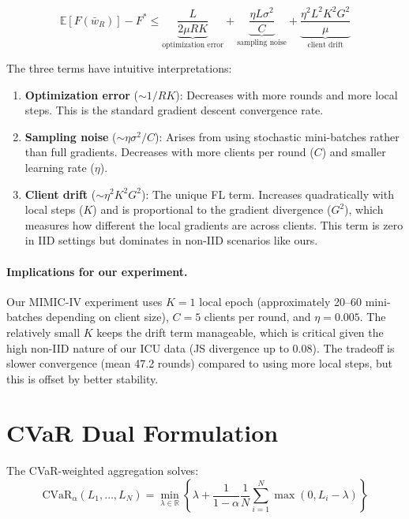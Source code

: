 \documentclass[11pt,a4paper]{report}
\begin{document}
\begin{equation}
\mathbb{E}[F(\bar{w}_R)] - F^* \leq \underbrace{\frac{L}{2\mu R K}}_{\text{optimization error}} + \underbrace{\frac{\eta L \sigma^2}{C}}_{\text{sampling noise}} + \underbrace{\frac{\eta^2 L^2 K^2 G^2}{\mu}}_{\text{client drift}}
\label{eq:fedavg_bound}
\end{equation}

The three terms have intuitive interpretations:
\begin{enumerate}[leftmargin=2em]
\item \textbf{Optimization error} ($\sim 1/RK$): Decreases with more rounds and more local steps. This is the standard gradient descent convergence rate.
\item \textbf{Sampling noise} ($\sim \eta\sigma^2/C$): Arises from using stochastic mini-batches rather than full gradients. Decreases with more clients per round ($C$) and smaller learning rate ($\eta$).
\item \textbf{Client drift} ($\sim \eta^2 K^2 G^2$): The unique FL term. Increases quadratically with local steps ($K$) and is proportional to the gradient divergence ($G^2$), which measures how different the local gradients are across clients. This term is zero in IID settings but dominates in non-IID scenarios like ours.
\end{enumerate}

\paragraph{Implications for our experiment.} Our MIMIC-IV experiment uses $K=1$ local epoch (approximately 20--60 mini-batches depending on client size), $C=5$ clients per round, and $\eta=0.005$. The relatively small $K$ keeps the drift term manageable, which is critical given the high non-IID nature of our ICU data (JS divergence up to 0.08). The tradeoff is slower convergence (mean 47.2 rounds) compared to using more local steps, but this is offset by better stability.

\section{CVaR Dual Formulation}

The CVaR-weighted aggregation solves:
\begin{equation}
\text{CVaR}_\alpha(L_1, \ldots, L_N) = \min_{\lambda \in \mathbb{R}} \left\{ \lambda + \frac{1}{1-\alpha} \frac{1}{N} \sum_{i=1}^{N} \max(0, L_i - \lambda) \right\}
\label{eq:cvar_dual}
\end{equation}
\end{document}
